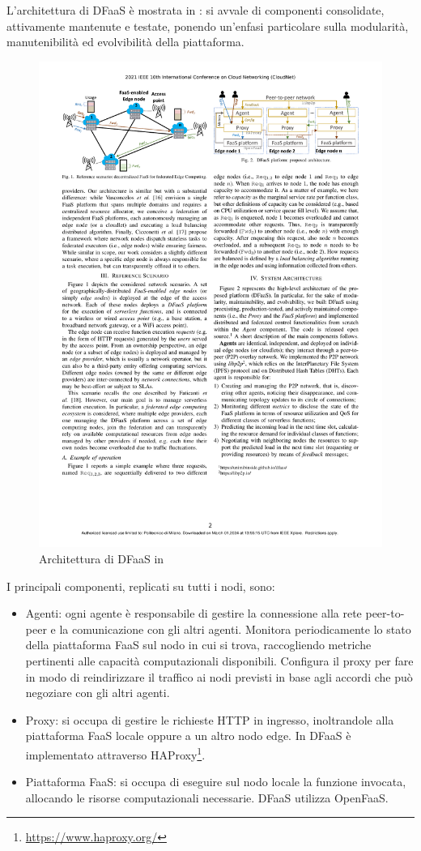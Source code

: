 L'architettura di DFaaS è mostrata in : si avvale di componenti consolidate, attivamente mantenute e testate, ponendo un'enfasi particolare sulla modularità, manutenibilità ed evolvibilità della piattaforma.

\begin{figure}
    \centering
    \includegraphics[width=.7\linewidth]{assets/2/dfaas_architecture.pdf}
    \caption[Architettura di DFaaS]{Architettura di DFaaS in \cite{Ciavotta2021}}
    \label{fig:2_dfaas_architecture}
\end{figure}

I principali componenti, replicati su tutti i nodi, sono:

\begin{itemize}
    \item Agenti: ogni agente è responsabile di gestire la connessione alla rete peer-to-peer e la comunicazione con gli altri agenti. Monitora periodicamente lo stato della piattaforma FaaS sul nodo in cui si trova, raccogliendo metriche pertinenti alle capacità computazionali disponibili. Configura il proxy per fare in modo di reindirizzare il traffico ai nodi previsti in base agli accordi che può negoziare con gli altri agenti. 

    \item Proxy: si occupa di gestire le richieste HTTP in ingresso, inoltrandole alla piattaforma FaaS locale oppure a un altro nodo edge. In DFaaS è implementato attraverso HAProxy\footnote{\url{https://www.haproxy.org/}}.  

    \item Piattaforma FaaS: si occupa di eseguire sul nodo locale la funzione invocata, allocando le risorse computazionali necessarie. DFaaS utilizza OpenFaaS.
\end{itemize}

